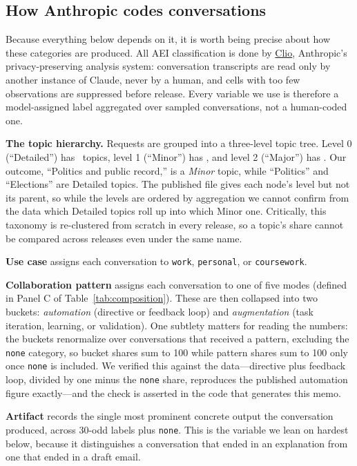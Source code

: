 \documentclass[11pt]{article}
\begin{document}
\subsection{How Anthropic codes conversations}

Because everything below depends on it, it is worth being precise about how these
categories are produced. All AEI classification is done by
\href{https://www.anthropic.com/research/clio}{Clio}, Anthropic's
privacy-preserving analysis system: conversation transcripts are read only by
another instance of Claude, never by a human, and cells with too few
observations are suppressed before release. Every variable we use is therefore a
model-assigned label aggregated over sampled conversations, not a human-coded one.

\textbf{The topic hierarchy.} Requests are grouped into a three-level topic
tree. Level 0 (``Detailed'') has \nDetailed\ topics, level 1 (``Minor'') has
\nMinor, and level 2 (``Major'') has \nMajor. Our outcome, ``Politics and public
record,'' is a \emph{Minor} topic, while ``Politics'' and ``Elections'' are
Detailed topics. The published file gives each node's level but not its parent,
so while the levels are ordered by aggregation we cannot confirm from the data
which Detailed topics roll up into which Minor one. Critically, this taxonomy is re-clustered from scratch in every
release, so a topic's share cannot be compared across releases even under the
same name.

\textbf{Use case} assigns each conversation to \texttt{work}, \texttt{personal},
or \texttt{coursework}.

\textbf{Collaboration pattern} assigns each conversation to one of five modes
(defined in Panel C of Table~\ref{tab:composition}). These are then collapsed
into two buckets: \emph{automation} (directive or feedback loop) and
\emph{augmentation} (task iteration, learning, or validation). One subtlety
matters for reading the numbers: the buckets renormalize over conversations that
received a pattern, excluding the \texttt{none} category, so bucket shares sum
to 100 while pattern shares sum to 100 only once \texttt{none} is included. We
verified this against the data---directive plus feedback loop, divided by one
minus the \texttt{none} share, reproduces the published automation figure
exactly---and the check is asserted in the code that generates this memo.

\textbf{Artifact} records the single most prominent concrete output the
conversation produced, across \mbox{30-odd} labels plus \texttt{none}. This is
the variable we lean on hardest below, because it distinguishes a conversation
that ended in an explanation from one that ended in a draft email.
\end{document}
